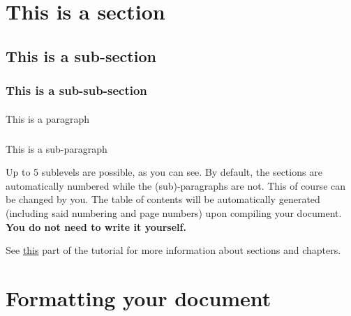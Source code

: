 \documentclass[
  12pt,
  a4paper,
]{article}
\makeatletter
\let\oldparagraph\paragraph
\renewcommand{\paragraph}{
    \@ifstar
      \xxxParagraphStar
      \xxxParagraphNoStar
  }
\newcommand{\xxxParagraphStar}[1]{\oldparagraph*{#1}\mbox{}}
\newcommand{\xxxParagraphNoStar}[1]{\oldparagraph{#1}\mbox{}}
\let\oldsubparagraph\subparagraph
\renewcommand{\subparagraph}{
    \@ifstar
      \xxxSubParagraphStar
      \xxxSubParagraphNoStar
  }
\newcommand{\xxxSubParagraphStar}[1]{\oldsubparagraph*{#1}\mbox{}}
\newcommand{\xxxSubParagraphNoStar}[1]{\oldsubparagraph{#1}\mbox{}}
\makeatother
\begin{document}
\section{This is a section}

\subsection{This is a sub-section}

\subsubsection{This is a sub-sub-section}

\paragraph{This is a paragraph}

\subparagraph{This is a sub-paragraph}


Up to 5 sublevels are possible, as you can see. By default, the sections are automatically numbered while the (sub)-paragraphs are not. This of course can be changed by you. The table of contents will be automatically generated (including said numbering and page numbers) upon compiling your document. \textbf{You do not need to write it yourself.}

See \href{https://www.overleaf.com/learn/latex/Sections_and_chapters}{this} part of the tutorial for more information about sections and chapters.



\section{Formatting your document}
\end{document}
